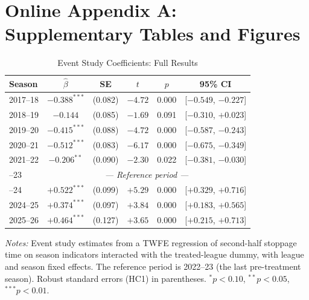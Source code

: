 
\appendix
\section*{Online Appendix A: Supplementary Tables and Figures}

\setcounter{table}{0}
\renewcommand{\thetable}{A\arabic{table}}
\setcounter{figure}{0}
\renewcommand{\thefigure}{A\arabic{figure}}


\begin{table}[htbp]
\centering
\begin{threeparttable}
\caption{Event Study Coefficients: Full Results}
\label{tab:event_study_full}
\begin{tabular}{lccccc}
\toprule
Season & $\hat{\beta}$ & SE & $t$ & $p$ & 95\% CI \\
\midrule
2017--18 & $-0.388^{***}$ & (0.082) & $-4.72$ & 0.000 & [$-0.549$, $-0.227$] \\
2018--19 & $-0.144$ & (0.085) & $-1.69$ & 0.091 & [$-0.310$, $+0.023$] \\
2019--20 & $-0.415^{***}$ & (0.088) & $-4.72$ & 0.000 & [$-0.587$, $-0.243$] \\
2020--21 & $-0.512^{***}$ & (0.083) & $-6.17$ & 0.000 & [$-0.675$, $-0.349$] \\
2021--22 & $-0.206^{**}$ & (0.090) & $-2.30$ & 0.022 & [$-0.381$, $-0.030$] \\
\addlinespace
2022--23 & \multicolumn{5}{c}{\textit{--- Reference period ---}} \\
\addlinespace
2023--24 & $+0.522^{***}$ & (0.099) & $+5.29$ & 0.000 & [$+0.329$, $+0.716$] \\
2024--25 & $+0.374^{***}$ & (0.097) & $+3.84$ & 0.000 & [$+0.183$, $+0.565$] \\
2025--26 & $+0.464^{***}$ & (0.127) & $+3.65$ & 0.000 & [$+0.215$, $+0.713$] \\
\bottomrule
\end{tabular}
\begin{tablenotes}[flushleft]
\footnotesize
\item \textit{Notes:} Event study estimates from a TWFE regression of second-half
stoppage time on season indicators interacted with the treated-league dummy, with
league and season fixed effects. The reference period is 2022--23 (the last
pre-treatment season). Robust standard errors (HC1) in parentheses.
$^{*}p<0.10$, $^{**}p<0.05$, $^{***}p<0.01$.
\end{tablenotes}
\end{threeparttable}
\end{table}

